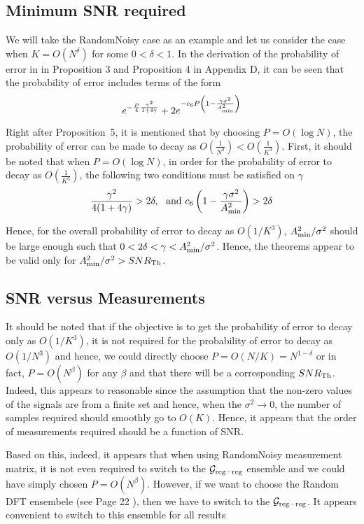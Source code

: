 \documentclass[conference]{IEEEtran}
\begin{document}
\subsection{Minimum SNR required}
We will take the RandomNoisy case as an example and let us consider the case when $K = O(N^\delta)$ for some $0 < \delta < 1$.  In the derivation of the probability of error in \cite{li2015subdraft} in Proposition 3 and Proposition 4 in Appendix D, it can be seen that the probability of error includes terms of the form
\[
e^{-\frac{P}{4} \frac{\gamma^2}{1+4\gamma}} + 2 e^{-c_6 P \left(1-\frac{\gamma \sigma^2}{A^2_{\rm min}} \right)}
\]

Right after Proposition~5, it is mentioned that by choosing $P = O(\log N)$, the probability of error can be made to decay as $O\left(\frac{1}{N^3} \right) <  O\left(\frac{1}{K^3} \right)$. First, it should be noted that when $P = O(\log N)$, in order for the probability of error to decay as $O\left(\frac{1}{K^3} \right)$, the following two conditions must be satisfied on $\gamma$
\[
\frac{\gamma^2}{4(1+4\gamma)} > 2 \delta, \ \ {\rm and} \ c_6 \left(1 - \frac{\gamma \sigma^2}{A_{\rm min}^2} \right) > 2 \delta
\]

Hence, for the overall probability of error to decay as $O(1/K^3)$, $A_{\rm min}^2/\sigma^2$ should be large enough such that $0 < 2 \delta < \gamma < A_{\rm min}^2/\sigma^2$. Hence, the theorems appear to be valid only for $A_{\rm min}^2/\sigma^2 > SNR_{\rm Th}$.

\subsection{SNR versus Measurements}
It should be noted that if the objective is to get the probability of error to decay only as $O(1/K^3)$, it is not required for the probability of error to decay as $O(1/N^3)$ and hence, we could directly choose $P = O(N/K) = N^{1-\delta}$ or in fact, $P = O(N^\beta)$ for any $\beta$ and that there will be a corresponding $SNR_{\rm Th}$. Indeed, this appears to reasonable since the assumption that the non-zero values of the signals are from a finite set and hence, when the $\sigma^2 \rightarrow 0$, the number of samples required should smoothly go to $O(K)$. Hence, it appears that the order of measurements required should be a function of SNR.

Based on this, indeed, it appears that when using RandomNoisy measurement matrix, it is not even required to switch to the $\mathcal{G}_{\rm reg-reg}$ ensemble and we could have simply chosen $P = O(N^\beta)$. However, if we want to choose the Random DFT ensembele (see Page 22 \cite{li2015subdraft}), then we have to switch to the $\mathcal{G}_{\rm reg-reg}$. It appears convenient to switch to this ensemble for all results
\end{document}
